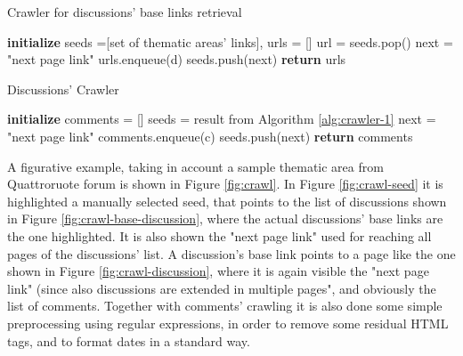 \begin{algorithm}
	\caption{Crawler for discussions' base links retrieval}
	\label{alg:crawler-1}
	\begin{algorithmic}[1]
		\State \textbf{initialize} seeds =[set of thematic areas' links], urls = []
		\State
		\State url = seeds.pop()
		\State next = "next page link"
		\State urls.enqueue(d)
		\EndFor
		\State seeds.push(next)
		\EndWhile
		\State \textbf{return} urls
	\end{algorithmic}
\end{algorithm}

\begin{algorithm}
	\caption{Discussions' Crawler}
	\label{alg:crawler-2}
	\begin{algorithmic}[1]
		\State \textbf{initialize} comments = []
		\State
		\State seeds = result from Algorithm \ref{alg:crawler-1}
		\State next = "next page link"
		\State comments.enqueue(c)
		\EndFor
		\State seeds.push(next)
		\EndWhile
		\State \textbf{return} comments
	\end{algorithmic}
\end{algorithm}

A figurative example, taking in account a sample thematic area from Quattroruote forum is shown in Figure \ref{fig:crawl}. In Figure \ref{fig:crawl-seed} it is highlighted a manually selected seed, that points to the list of discussions shown in Figure \ref{fig:crawl-base-discussion}, where the actual discussions' base links are the one highlighted. It is also shown the "next page link" used for reaching all pages of the discussions' list. A discussion's base link points to a page like the one shown in Figure \ref{fig:crawl-discussion}, where it is again visible the "next page link" (since also discussions are extended in multiple pages", and obviously the list of comments.
Together with comments' crawling it is also done some simple preprocessing using regular expressions, in order to remove some residual \ac{HTML} tags, and to format dates in a standard way.


